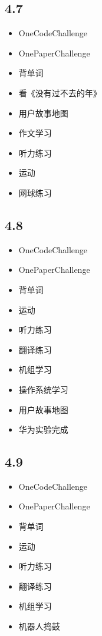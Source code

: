 \documentclass[UTF8]{ctexart}
\begin{document}
\subsection*{4.7}
\begin{itemize}
    \item OneCodeChallenge
    \item OnePaperChallenge
    \item 背单词
    \item 看《没有过不去的年》
    \item 用户故事地图
    \item 作文学习
    \item 听力练习
    \item 运动
    \item 网球练习
\end{itemize}

\subsection*{4.8}
\begin{itemize}
    \item OneCodeChallenge
    \item OnePaperChallenge
    \item 背单词
    \item 运动
    \item 听力练习
    \item 翻译练习
    \item 机组学习
    \item 操作系统学习
    \item 用户故事地图
    \item 华为实验完成
\end{itemize}

\subsection*{4.9}
\begin{itemize}
    \item OneCodeChallenge
    \item OnePaperChallenge
    \item 背单词
    \item 运动
    \item 听力练习
    \item 翻译练习
    \item 机组学习
    \item 机器人捣鼓
\end{itemize}
\end{document}
